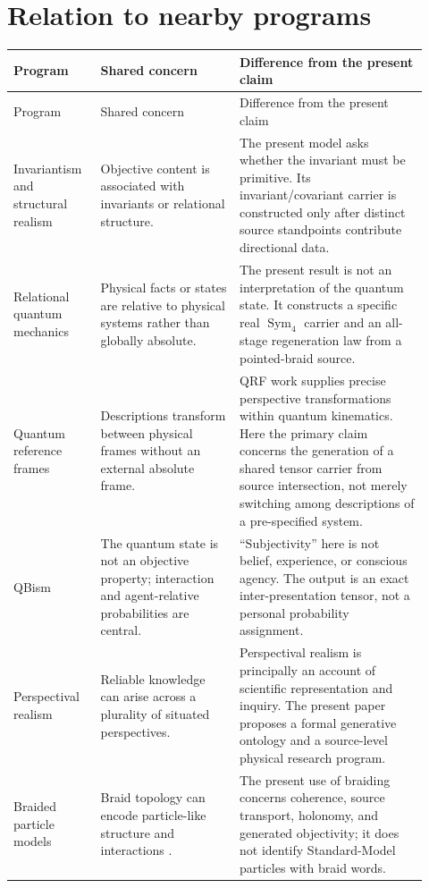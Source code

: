 \documentclass[11pt]{article}
\theoremstyle{definition}
\theoremstyle{remark}
\newcommand{\Sym}{\operatorname{Sym}}
\begin{document}
\section{Relation to nearby programs}

{\small\setlength{\parskip}{0pt}
\begin{longtable}{>{\raggedright\arraybackslash}p{0.19\linewidth}>{\raggedright\arraybackslash}p{0.31\linewidth}>{\raggedright\arraybackslash}p{0.42\linewidth}}
\toprule
Program & Shared concern & Difference from the present claim \\
\midrule
\endfirsthead
\toprule
Program & Shared concern & Difference from the present claim \\
\midrule
\endhead
Invariantism and structural realism & Objective content is associated with invariants or relational structure. & The present model asks whether the invariant must be primitive. Its invariant/covariant carrier is constructed only after distinct source standpoints contribute directional data. \\
Relational quantum mechanics & Physical facts or states are relative to physical systems rather than globally absolute. & The present result is not an interpretation of the quantum state. It constructs a specific real $\Sym_4$ carrier and an all-stage regeneration law from a pointed-braid source. \\
Quantum reference frames & Descriptions transform between physical frames without an external absolute frame. & QRF work supplies precise perspective transformations within quantum kinematics. Here the primary claim concerns the generation of a shared tensor carrier from source intersection, not merely switching among descriptions of a pre-specified system. \\
QBism & The quantum state is not an objective property; interaction and agent-relative probabilities are central. & ``Subjectivity'' here is not belief, experience, or conscious agency. The output is an exact inter-presentation tensor, not a personal probability assignment. \\
Perspectival realism & Reliable knowledge can arise across a plurality of situated perspectives. & Perspectival realism is principally an account of scientific representation and inquiry. The present paper proposes a formal generative ontology and a source-level physical research program. \\
Braided particle models & Braid topology can encode particle-like structure and interactions \cite{bilsonthompson2005}. & The present use of braiding concerns coherence, source transport, holonomy, and generated objectivity; it does not identify Standard-Model particles with braid words. \\

\end{longtable}}
\end{document}
